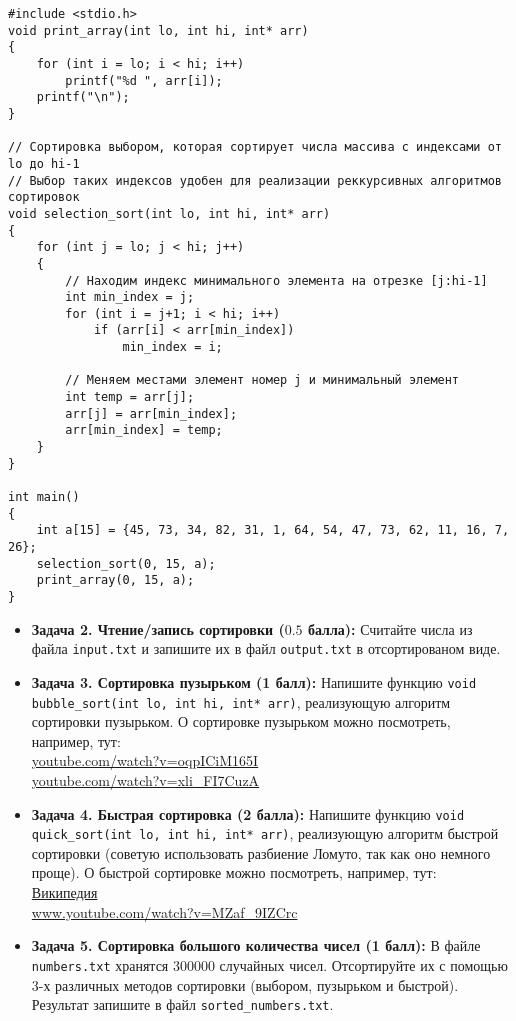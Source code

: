 \documentclass{article}
\begin{document}
\begin{lstlisting}
#include <stdio.h>
void print_array(int lo, int hi, int* arr)
{
	for (int i = lo; i < hi; i++)
		printf("%d ", arr[i]);
	printf("\n");	
}

// Сортировка выбором, которая сортирует числа массива с индексами от lo до hi-1
// Выбор таких индексов удобен для реализации реккурсивных алгоритмов сортировок
void selection_sort(int lo, int hi, int* arr)
{
	for (int j = lo; j < hi; j++)
	{
		// Находим индекс минимального элемента на отрезке [j:hi-1]
		int min_index = j;
		for (int i = j+1; i < hi; i++)
			if (arr[i] < arr[min_index])
				min_index = i;
		
		// Меняем местами элемент номер j и минимальный элемент
		int temp = arr[j];
		arr[j] = arr[min_index];
		arr[min_index] = temp;
	}
}

int main()
{
	int a[15] = {45, 73, 34, 82, 31, 1, 64, 54, 47, 73, 62, 11, 16, 7, 26};
	selection_sort(0, 15, a);
	print_array(0, 15, a);
}
\end{lstlisting}
\begin{itemize}
\item \textbf{Задача 2. Чтение/запись сортировки ($0.5$ балла):} Считайте числа из файла \texttt{input.txt} и запишите их в файл \texttt{output.txt} в отсортированом виде.
\item \textbf{Задача 3. Сортировка пузырьком (1 балл):} Напишите функцию \texttt{void bubble\_sort(int lo, int hi, int* arr)}, реализующую алгоритм сортировки пузырьком. О сортировке пузырьком можно посмотреть, например, тут:\\
\href{https://www.youtube.com/watch?v=oqpICiM165I}{youtube.com/watch?v=oqpICiM165I} \\
\href{https://www.youtube.com/watch?v=xli_FI7CuzA}{youtube.com/watch?v=xli\_FI7CuzA}

\item \textbf{Задача 4. Быстрая сортировка (2 балла):} Напишите функцию \texttt{void quick\_sort(int lo, int hi, int* arr)}, реализующую алгоритм быстрой сортировки (советую использовать разбиение Ломуто, так как оно немного проще). О быстрой сортировке можно посмотреть, например, тут:\\
\href{https://ru.wikipedia.org/wiki/%D0%91%D1%8B%D1%81%D1%82%D1%80%D0%B0%D1%8F_%D1%81%D0%BE%D1%80%D1%82%D0%B8%D1%80%D0%BE%D0%B2%D0%BA%D0%B0}{Википедия}\\
\href{https://www.youtube.com/watch?v=MZaf_9IZCrc}{www.youtube.com/watch?v=MZaf\_9IZCrc}

\item \textbf{Задача 5. Сортировка большого количества чисел (1 балл):} В файле \texttt{numbers.txt} хранятся 300000 случайных чисел. Отсортируйте их с помощью 3-х различных методов сортировки (выбором, пузырьком и быстрой). Результат запишите в файл \texttt{sorted\_numbers.txt}.
\end{itemize}
\newpage
\end{document}
